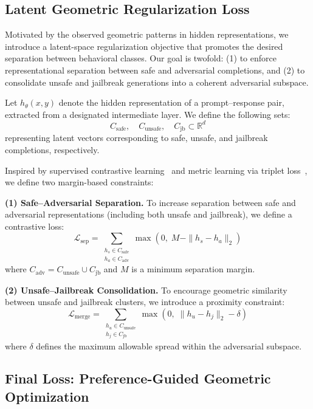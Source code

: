 \subsection{Latent Geometric Regularization Loss}

Motivated by the observed geometric patterns in hidden representations, we introduce a latent-space regularization objective that promotes the desired separation between behavioral classes. Our goal is twofold: (1) to enforce representational separation between safe and adversarial completions, and (2) to consolidate unsafe and jailbreak generations into a coherent adversarial subspace.

Let $h_\theta(x, y)$ denote the hidden representation of a prompt–response pair, extracted from a designated intermediate layer. We define the following sets:
\[
C_{\mathrm{safe}},\quad C_{\mathrm{unsafe}},\quad C_{\mathrm{jb}} \subset \mathbb{R}^d
\]
representing latent vectors corresponding to safe, unsafe, and jailbreak completions, respectively.

Inspired by supervised contrastive learning~\cite{khosla2020supervised} and metric learning via triplet loss~\cite{schroff2015facenet}, we define two margin-based constraints:

\vspace{1mm}
\textbf{(1) Safe–Adversarial Separation.} To increase separation between safe and adversarial representations (including both unsafe and jailbreak), we define a contrastive loss:
\[
\mathcal{L}_{\mathrm{sep}} = \sum_{\substack{h_s \in C_{\mathrm{safe}} \\ h_a \in C_{\mathrm{adv}}}} \max(0,\; M - \|h_s - h_a\|_2)
\]
where $C_{\mathrm{adv}} = C_{\mathrm{unsafe}} \cup C_{\mathrm{jb}}$ and $M$ is a minimum separation margin.

\vspace{1mm}
\textbf{(2) Unsafe–Jailbreak Consolidation.} To encourage geometric similarity between unsafe and jailbreak clusters, we introduce a proximity constraint:
\[
\mathcal{L}_{\mathrm{merge}} = \sum_{\substack{h_u \in C_{\mathrm{unsafe}} \\ h_j \in C_{\mathrm{jb}}}} \max(0,\; \|h_u - h_j\|_2 - \delta)
\]
where $\delta$ defines the maximum allowable spread within the adversarial subspace.





\vspace{1mm}
\subsection{Final Loss: Preference-Guided Geometric Optimization}


